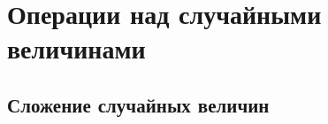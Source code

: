 \documentclass[unicode,11pt,notheorems,xcolor=table]{beamer}
\begin{document}











\section{Операции над случайными величинами}
\subsection{Сложение случайных величин}
\end{document}
